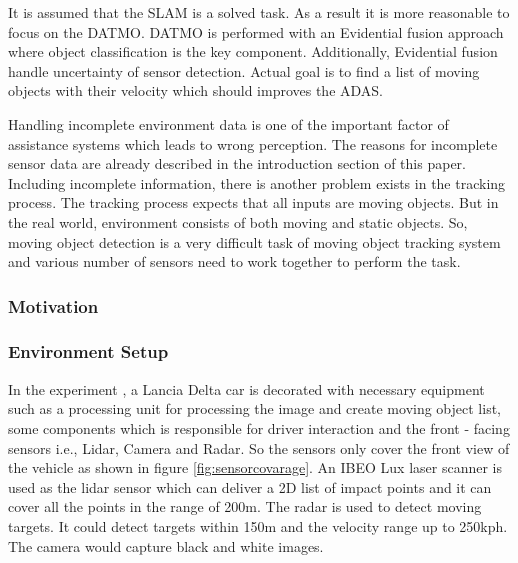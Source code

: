 It is assumed that the SLAM is a solved task. As a result it is more reasonable to focus on the DATMO\cite{Chavez_Garcia_2016}. DATMO is performed with an Evidential fusion approach where object classification is the key component. Additionally, Evidential fusion handle uncertainty of sensor detection. Actual goal is to find a list of moving objects with their velocity which should improves the ADAS.

Handling incomplete environment data is one of the important factor of assistance systems which leads to wrong perception. The reasons for incomplete sensor data are already described in the introduction section of this paper. Including incomplete information, there is another problem exists in the tracking process. The tracking process expects that all inputs are moving objects. But in the real world, environment consists of both moving and static objects. So, moving object detection is a very difficult task of moving object tracking system and various number of sensors need to work together to perform the task.

\subsubsection{Motivation}

\subsubsection{Environment Setup}
In the experiment \cite{Chavez_Garcia_2016}, a Lancia Delta car is decorated with necessary equipment such as a processing unit for processing the image and create moving object list, some components which is responsible for driver interaction and the front - facing sensors i.e., Lidar, Camera and Radar. So the sensors only cover the front view of the vehicle as shown in figure \ref{fig:sensorcovarage}. An IBEO Lux laser scanner is used as the lidar sensor which can deliver a 2D list of impact points and it can cover all the points in the range of 200m. The radar is used to detect moving targets. It could detect targets within 150m and the velocity range up to 250kph. The camera would capture black and white images.

